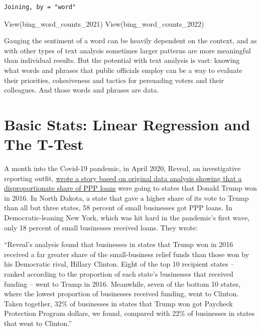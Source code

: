 \documentclass[
  letterpaper,
  DIV=11,
  numbers=noendperiod]{scrreprt}
\newenvironment{Shaded}{\begin{snugshade}}{\end{snugshade}}
\newcommand{\FunctionTok}[1]{\textcolor[rgb]{0.28,0.35,0.67}{#1}}
\newcommand{\NormalTok}[1]{\textcolor[rgb]{0.00,0.23,0.31}{#1}}
\begin{document}
\begin{verbatim}
Joining, by = "word"
\end{verbatim}

\begin{Shaded}
\begin{Highlighting}[]
\FunctionTok{View}\NormalTok{(bing\_word\_counts\_2021)}
\FunctionTok{View}\NormalTok{(bing\_word\_counts\_2022)}
\end{Highlighting}
\end{Shaded}

Gauging the sentiment of a word can be heavily dependent on the context,
and as with other types of text analysis sometimes larger patterns are
more meaningful than individual results. But the potential with text
analysis is vast: knowing what words and phrases that public officials
employ can be a way to evaluate their priorities, cohesiveness and
tactics for persuading voters and their colleagues. And those words and
phrases are data.


\hypertarget{basic-stats-linear-regression-and-the-t-test}{%
\chapter{Basic Stats: Linear Regression and The
T-Test}\label{basic-stats-linear-regression-and-the-t-test}}

A month into the Covid-19 pandemic, in April 2020, Reveal, an
investigative reporting outfit,
\href{https://revealnews.org/article/bailout-money-bypasses-hard-hit-new-york-california-for-north-dakota-nebraska/}{wrote
a story based on original data analysis showing that a disproportionate
share of PPP loans} were going to states that Donald Trump won in 2016.
In North Dakota, a state that gave a higher share of its vote to Trump
than all but three states, 58 percent of small businesses got PPP loans.
In Democratic-leaning New York, which was hit hard in the pandemic's
first wave, only 18 percent of small businesses received loans. They
wrote:

``Reveal's analysis found that businesses in states that Trump won in
2016 received a far greater share of the small-business relief funds
than those won by his Democratic rival, Hillary Clinton. Eight of the
top 10 recipient states -- ranked according to the proportion of each
state's businesses that received funding -- went to Trump in 2016.
Meanwhile, seven of the bottom 10 states, where the lowest proportion of
businesses received funding, went to Clinton. Taken together, 32\% of
businesses in states that Trump won got Paycheck Protection Program
dollars, we found, compared with 22\% of businesses in states that went
to Clinton.''
\end{document}
